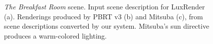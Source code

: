 \begin{figure}[h]
  \centering
  \\
  \\
  \caption{\textit{The Breakfast Room} scene. Input scene description for LuxRender (a). Renderings produced by PBRT v3 (b) and Mitsuba (c), from scene descriptions converted by our system. Mitsuba's sun directive produces a warm-colored lighting.}
  \label{fig:dining-room}
\end{figure}

